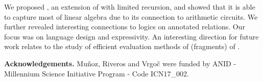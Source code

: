 We proposed \langfor, an extension of \lang with limited recursion,
and showed that it is able to capture most of linear algebra due to its
connection to arithmetic circuits. We further revealed interesting connections
to logics on annotated relations. Our focus was on language design and
expressivity. An interesting direction for future work relates to the study of 
efficient evaluation methods of (fragments) of \langfor. 

\medskip
\noindent \textbf{Acknowledgements.} Mu\~noz, Riveros and Vrgo\v{c} were funded by ANID - Millennium Science Initiative Program - Code ICN17\_002.
